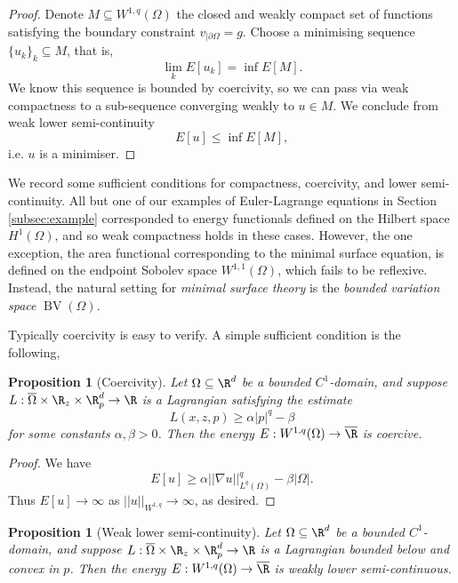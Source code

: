 \documentclass[reqno]{amsart}
\newtheorem{proposition}[theorem]{Proposition}
\theoremstyle{definition}
\theoremstyle{remark}
\begin{document}
\begin{proof}
	Denote $M \subseteq W^{1, q} (\Omega)$ the closed and weakly compact set of functions satisfying the boundary constraint $v_{|\partial \Omega} = g$. Choose a minimising sequence $\{u_k\}_k \subseteq M$, that is, 
		\[ \lim_k E[u_k] = \inf E[M]. \]
	We know this sequence is bounded by coercivity, so we can pass via weak compactness to a sub-sequence converging weakly to $u \in M$. We conclude from weak lower semi-continuity
		\[ E[u] \leq \inf E[M],  \]
	i.e. $u$ is a minimiser. 	 
\end{proof}

We record some sufficient conditions for compactness, coercivity, and lower semi-continuity. All but one of our examples of Euler-Lagrange equations in Section \ref{subsec:example} corresponded to energy functionals defined on the Hilbert space $H^1 (\Omega)$, and so weak compactness holds in these cases. However, the one exception, the area functional corresponding to the minimal surface equation, is defined on the endpoint Sobolev space $W^{1, 1} (\Omega)$, which fails to be reflexive. Instead, the natural setting for \textit{minimal surface theory} is the \textit{bounded variation space} $\operatorname{BV} (\Omega)$.

Typically coercivity is easy to verify. A simple sufficient condition is the following, 

\begin{proposition}[Coercivity]
	Let $\Omega \subseteq \R^d$ be a bounded $C^1$-domain, and suppose $L : \overline\Omega \times \R_z \times \R^d_p \to \R$ is a Lagrangian satisfying the estimate
		\[ L(x, z, p) \geq \alpha |p|^q - \beta \]
	for some constants $\alpha, \beta > 0$. Then the energy $E : W^{1, q} (\Omega) \to \overline \R$ is coercive. 
\end{proposition}

\begin{proof}
	We have
		\[ E[u] \geq \alpha ||\nabla u||^q_{L^q (\Omega)} - \beta |\Omega|. \]
	Thus $E[u] \to \infty$ as $||u||_{W^{1, q}} \to \infty$, as desired. 	
\end{proof}




\begin{proposition}[Weak lower semi-continuity]
	Let $\Omega \subseteq \R^d$ be a bounded $C^1$-domain, and suppose $L : \overline\Omega \times \R_z \times \R^d_p \to \R$ is a Lagrangian bounded below and convex in $p$. Then the energy $E: W^{1, q} (\Omega) \to \overline \R$ is weakly lower semi-continuous. 
\end{proposition}
\end{document}
